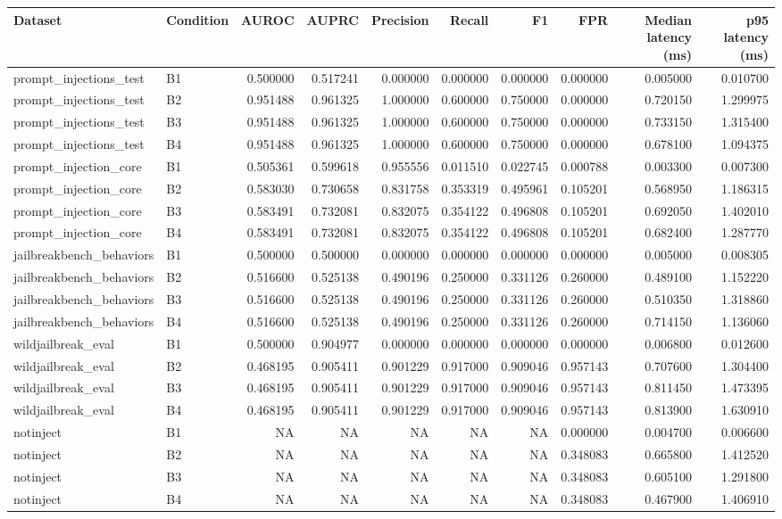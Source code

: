 \begin{tabular}{llrrrrrrrr}
\toprule
Dataset & Condition & AUROC & AUPRC & Precision & Recall & F1 & FPR & Median latency (ms) & p95 latency (ms) \\
\midrule
prompt_injections_test & B1 & 0.500000 & 0.517241 & 0.000000 & 0.000000 & 0.000000 & 0.000000 & 0.005000 & 0.010700 \\
prompt_injections_test & B2 & 0.951488 & 0.961325 & 1.000000 & 0.600000 & 0.750000 & 0.000000 & 0.720150 & 1.299975 \\
prompt_injections_test & B3 & 0.951488 & 0.961325 & 1.000000 & 0.600000 & 0.750000 & 0.000000 & 0.733150 & 1.315400 \\
prompt_injections_test & B4 & 0.951488 & 0.961325 & 1.000000 & 0.600000 & 0.750000 & 0.000000 & 0.678100 & 1.094375 \\
prompt_injection_core & B1 & 0.505361 & 0.599618 & 0.955556 & 0.011510 & 0.022745 & 0.000788 & 0.003300 & 0.007300 \\
prompt_injection_core & B2 & 0.583030 & 0.730658 & 0.831758 & 0.353319 & 0.495961 & 0.105201 & 0.568950 & 1.186315 \\
prompt_injection_core & B3 & 0.583491 & 0.732081 & 0.832075 & 0.354122 & 0.496808 & 0.105201 & 0.692050 & 1.402010 \\
prompt_injection_core & B4 & 0.583491 & 0.732081 & 0.832075 & 0.354122 & 0.496808 & 0.105201 & 0.682400 & 1.287770 \\
jailbreakbench_behaviors & B1 & 0.500000 & 0.500000 & 0.000000 & 0.000000 & 0.000000 & 0.000000 & 0.005000 & 0.008305 \\
jailbreakbench_behaviors & B2 & 0.516600 & 0.525138 & 0.490196 & 0.250000 & 0.331126 & 0.260000 & 0.489100 & 1.152220 \\
jailbreakbench_behaviors & B3 & 0.516600 & 0.525138 & 0.490196 & 0.250000 & 0.331126 & 0.260000 & 0.510350 & 1.318860 \\
jailbreakbench_behaviors & B4 & 0.516600 & 0.525138 & 0.490196 & 0.250000 & 0.331126 & 0.260000 & 0.714150 & 1.136060 \\
wildjailbreak_eval & B1 & 0.500000 & 0.904977 & 0.000000 & 0.000000 & 0.000000 & 0.000000 & 0.006800 & 0.012600 \\
wildjailbreak_eval & B2 & 0.468195 & 0.905411 & 0.901229 & 0.917000 & 0.909046 & 0.957143 & 0.707600 & 1.304400 \\
wildjailbreak_eval & B3 & 0.468195 & 0.905411 & 0.901229 & 0.917000 & 0.909046 & 0.957143 & 0.811450 & 1.473395 \\
wildjailbreak_eval & B4 & 0.468195 & 0.905411 & 0.901229 & 0.917000 & 0.909046 & 0.957143 & 0.813900 & 1.630910 \\
notinject & B1 & NA & NA & NA & NA & NA & 0.000000 & 0.004700 & 0.006600 \\
notinject & B2 & NA & NA & NA & NA & NA & 0.348083 & 0.665800 & 1.412520 \\
notinject & B3 & NA & NA & NA & NA & NA & 0.348083 & 0.605100 & 1.291800 \\
notinject & B4 & NA & NA & NA & NA & NA & 0.348083 & 0.467900 & 1.406910 \\
\bottomrule
\end{tabular}
